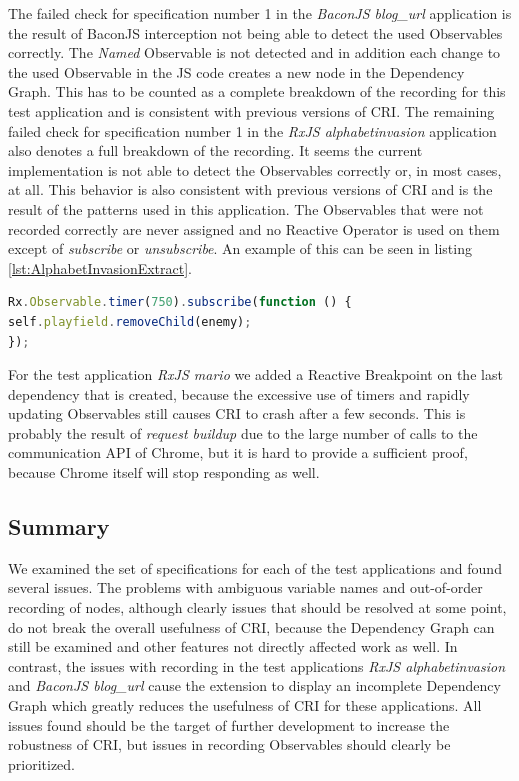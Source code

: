 The failed check for specification number 1 in the \emph{BaconJS blog\_url} application is the result of BaconJS interception not being able to detect the used Observables correctly. The \emph{Named} Observable is not detected and in addition each change to the used Observable in the JS code creates a new node in the Dependency Graph. This has to be counted as a complete breakdown of the recording for this test application and is consistent with previous versions of CRI. The remaining failed check for specification number 1 in the \emph{RxJS alphabetinvasion} application also denotes a full breakdown of the recording. It seems the current implementation is not able to detect the Observables correctly or, in most cases, at all. This behavior is also consistent with previous versions of CRI and is the result of the patterns used in this application. The Observables that were not recorded correctly are never assigned and no Reactive Operator is used on them except of \emph{subscribe} or \emph{unsubscribe}. An example of this can be seen in listing \ref{lst:AlphabetInvasionExtract}.

\begin{lstlisting}[language=JavaScript, caption={Extract of RxJS AlphabetInvasion test application.},label={lst:AlphabetInvasionExtract}]
Rx.Observable.timer(750).subscribe(function () {
self.playfield.removeChild(enemy);
});	
\end{lstlisting}

For the test application \emph{RxJS mario} we added a Reactive Breakpoint on the last dependency that is created, because the excessive use of timers and rapidly updating Observables still causes CRI to crash after a few seconds. This is probably the result of \emph{request buildup} due to the large number of calls to the communication API of Chrome, but it is hard to provide a sufficient proof, because Chrome itself will stop responding as well.

\subsection{Summary}
We examined the set of specifications for each of the test applications and found several issues. The problems with ambiguous variable names and out-of-order recording of nodes, although clearly issues that should be resolved at some point, do not break the overall usefulness of CRI, because the Dependency Graph can still be examined and other features not directly affected work as well. In contrast, the issues with recording in the test applications \emph{RxJS alphabetinvasion} and \emph{BaconJS blog\_url} cause the extension to display an incomplete Dependency Graph which greatly reduces the usefulness of CRI for these applications.
All issues found should be the target of further development to increase the robustness of CRI, but issues in recording Observables should clearly be prioritized.
